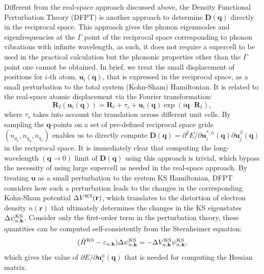 Different from the real-space approach discussed above,  the Density Functional Perturbation Theory (DFPT)\cite{baroni2001phonons} is another approach to determine $\bm{D}(\bm{q})$ directly in the reciprocal space. This approach gives the phonon eigenmodes and eigenfrequencies at the $\Gamma$ point of the reciprocal space corresponding to phonon vibrations with infinite wavelength, as such, it does not require a supercell to be used in the practical calculation but the phononic properties other than the  $\Gamma$ point one cannot be obtained. In brief, we treat the small displacement of  positions for $i$-th atom, $\bm{u}_i(\bm{q})$, that is expressed in the reciprocal space, as a small perturbation to the total system (Kohn-Sham) Hamiltonian. It is related to the real-space atomic displacement via the Fourier transformation:
\begin{equation*}
    \bm{R}_{I}(\bm{u}_i(\bm{q}))=\bm{R}_\ell+\tau_{s}+\bm{u}_i(\bm{q})\exp(i\bm{q}\cdot\bm{R}_\ell),
\end{equation*}
where $\tau_s$ takes into account the translation across different unit cells. By sampling the $\bm{q}$-points on a set of pre-defined reciprocal space grids $(n_{q_x},n_{q_{y}},n_{q_z})$ enables us to directly compute $\bm{D}(\bm{q})=\partial^2 E/\partial \bm{u}_i^{*,\alpha}(\bm{q})\partial \bm{u}_j^{\beta}(\bm{q})$ in the reciprocal space. It is immediately clear that computing the long-wavelength $(\bm{q}\to 0)$ limit of $\bm{D}(\bm{q})$ using this approach is trivial, which bypass the necessity of using large supercell as needed in the real-space approach. By treating $\bm{u}$ as a small perturbation to the system KS Hamiltonian, DFPT considers how such a  perturbation leads to the changes in the corresponding Kohn-Sham potential $\Delta V^{\mbox{\scriptsize{KS}}}(\mathbf{r})$, which translates to the distortion of electron density $n(\bm{r})$ that ultimately determines the changes in the KS eigenstates $\Delta\psi_{n,\mathbf{k}}^{\mbox{\scriptsize{KS}}}$. Consider only the first-order term in the perturbation theory, these quantities can be computed self-consistently from the Sternheimer equation:\cite{sternheimer1954electronic}
\begin{equation}
    \label{eq:sternheimer}
    (\hat{H}^{\mbox{\scriptsize{KS}}}-\varepsilon_{n,\mathbf{k}})\Delta\psi_{n,\mathbf{k}}^{\mbox{\scriptsize{KS}}}=-\Delta V_{n,\mathbf{k}}^{\mbox{\scriptsize{KS}}}\psi_{n,\mathbf{k}}^{\mbox{\scriptsize{KS}}},
\end{equation}
which gives the value of $\partial E/\partial \bm{u}_{i}^{\alpha}({\bm{q}})$ that is needed for computing the Hessian matrix.



